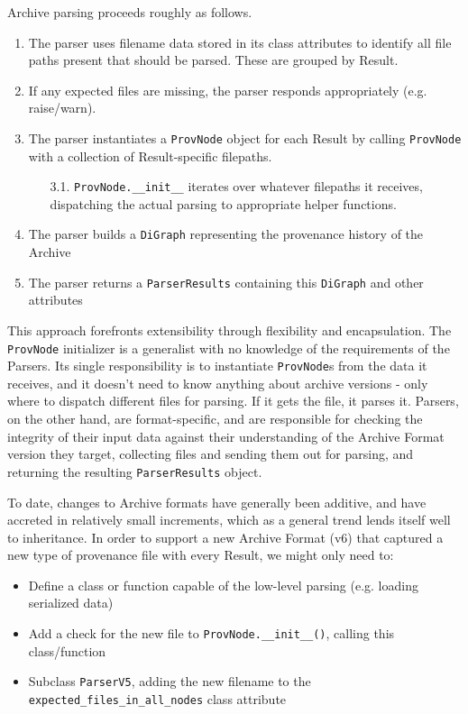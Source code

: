 Archive parsing proceeds roughly as follows.
\begin{enumerate}
    \item The parser uses filename data stored in its class attributes to identify all file paths present that should be parsed. These are grouped by Result.
    \item If any expected files are missing, the parser responds appropriately (e.g. raise/warn).
    \item The parser instantiates a \texttt{ProvNode} object for each Result by calling \texttt{ProvNode} with a collection of Result-specific filepaths.
    \begin{enumerate}
        \item[3.1.]\texttt{ProvNode.\_\_init\_\_} iterates over whatever filepaths it receives, dispatching the actual parsing to appropriate helper functions. 
    \end{enumerate}
    \item The parser builds a \texttt{DiGraph} representing the provenance history of the Archive
    \item The parser returns a \texttt{ParserResults} containing this \texttt{DiGraph} and other attributes
\end{enumerate}

This approach forefronts extensibility through flexibility and encapsulation.
The \texttt{ProvNode} initializer is a generalist with no knowledge of the requirements
of the Parsers. Its single responsibility is to instantiate \texttt{ProvNode}s from the
data it receives, and it doesn’t need to know anything about archive versions -
only where to dispatch different files for parsing. If it gets the file, it
parses it. Parsers, on the other hand, are format-specific, and are responsible
for checking the integrity of their input data against their understanding of
the Archive Format version they target, collecting files and sending them out
for parsing, and returning the resulting \texttt{ParserResults} object.

To date, changes to Archive formats have generally been additive, and have
accreted in relatively small increments, which as a general trend lends itself
well to inheritance. In order to support a new Archive Format (v6) that captured
a new type of provenance file with every Result, we might only need to:
\begin{itemize}
    \item Define a class or function capable of the low-level parsing (e.g. loading serialized data)
    \item Add a check for the new file to \texttt{ProvNode.\_\_init\_\_()}, calling this class/function
    \item Subclass \texttt{ParserV5}, adding the new filename to the \texttt{expected\_files\_in\_all\_nodes} class attribute
\end{itemize}

